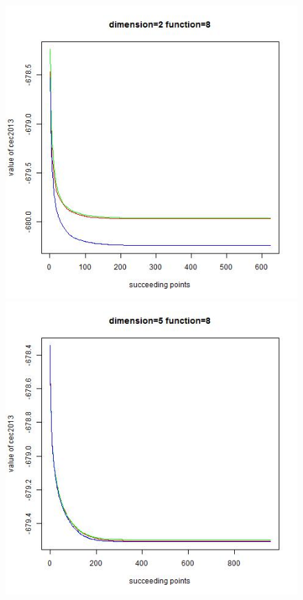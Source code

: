 \documentclass{article}
\begin{document}
\begin{figure}[!htb]
\centering
{}
  \includegraphics[width=\linewidth]{dim_2__func_8}
\endminipage\hfill
{}
  \includegraphics[width=\linewidth]{dim_5__func_8}

\end{figure}
\end{document}

